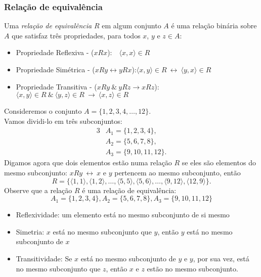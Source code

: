      \subsubsection{Relação de equivalência}
         \begin{definition}
            Uma \textit{relação de equivalência} $R$ em algum conjunto $A$ é uma relação binária sobre $A$ que satisfaz três propriedades, para todos $x$, $y$ e $z \in A$:
               \begin{itemize}
                  \item Propriedade Reflexiva - ($xRx$):\quad \quad \quad \quad \quad \quad \quad\ \ $\langle x, x \rangle \in R$
                  \item Propriedade Simétrica - ($xRy \leftrightarrow yRx$):\quad \quad \quad \quad $\langle x, y \rangle \in R\ \leftrightarrow\ \langle y, x \rangle \in R$
                  \item Propriedade Transitiva - ($xRy\ \&\ yRz \rightarrow xRz$):\quad $\langle x, y \rangle \in R\ \&\ \langle y, z \rangle \in R\ \rightarrow\ \langle x, z \rangle \in R$
               \end{itemize}
         \end{definition}
         \begin{exmp}
            Consideremos o conjunto $A = \{1,2,3,4, \dots , 12\}.$\\
            Vamos dividi-lo em três subconjuntos:
            \begin{alignat*}{3}
               &A_{1} = \{1,2,3,4\},\\
               &A_{2} = \{5,6,7,8\},\\
               &A_{3} = \{9,10,11,12\}.
            \end{alignat*}
            Digamos agora que dois elementos estão numa relação $R$ se eles são elementos do mesmo subconjunto:
            $xRy\ \leftrightarrow\ x$ e $y$ pertencem ao mesmo subconjunto, então
            $$R = \{\langle 1,1 \rangle , \langle 1,2 \rangle , \dots , \langle 5,5 \rangle , \langle 5,6 \rangle , \dots , \langle 9,12 \rangle , \langle 12,9 \rangle \}.$$
            Observe que a relação $R$ é uma relação de equivalência:
            $$A_{1} = \{1,2,3,4\}, A_{2} = \{5,6,7,8\}, A_{3} = \{9,10,11,12\}$$
            \begin{itemize}
               \item Reflexividade: um elemento está no mesmo subconjunto de si mesmo
               \item Simetria: $x$ está no mesmo subconjunto que $y$, então $y$ está no mesmo subconjunto de $x$
               \item Transitividade: Se $x$ está no mesmo subconjunto de $y$ e $y$, por sua vez, está no mesmo subconjunto que $z$, então $x$ e $z$ estão no mesmo subconjunto.
            \end{itemize}
         \end{exmp}

